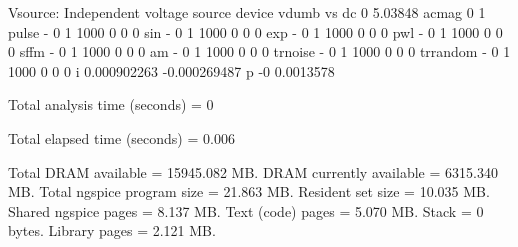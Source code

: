  Vsource: Independent voltage source
     device                 vdumb                    vs
         dc                     0               5.03848
      acmag                     0                     1
      pulse         -                     0
                                          1
                                       1000
                                          0
                                          0
                                          0
        sin         -                     0
                                          1
                                       1000
                                          0
                                          0
                                          0
        exp         -                     0
                                          1
                                       1000
                                          0
                                          0
                                          0
        pwl         -                     0
                                          1
                                       1000
                                          0
                                          0
                                          0
       sffm         -                     0
                                          1
                                       1000
                                          0
                                          0
                                          0
         am         -                     0
                                          1
                                       1000
                                          0
                                          0
                                          0
    trnoise         -                     0
                                          1
                                       1000
                                          0
                                          0
                                          0
   trrandom         -                     0
                                          1
                                       1000
                                          0
                                          0
                                          0
          i           0.000902263          -0.000269487
          p                    -0             0.0013578


Total analysis time (seconds) = 0

Total elapsed time (seconds) = 0.006 

Total DRAM available = 15945.082 MB.
DRAM currently available = 6315.340 MB.
Total ngspice program size =   21.863 MB.
Resident set size =   10.035 MB.
Shared ngspice pages =    8.137 MB.
Text (code) pages =    5.070 MB.
Stack = 0 bytes.
Library pages =    2.121 MB.

